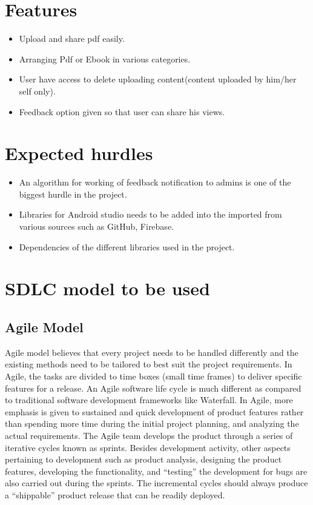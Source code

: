 \section{Features}
\begin{itemize}
	\item Upload and share pdf easily.
	\item Arranging Pdf or Ebook in various categories.
	\item User have access to delete uploading content(content uploaded by him/her self only). 
	 \item Feedback option given so that user can share his views.
\end{itemize}

	 	
\section{Expected hurdles}
\begin{itemize}
\item An algorithm for working of feedback notification to admins is one of the biggest hurdle in the project.
\item Libraries for Android studio needs to be added into the imported from various sources such as GitHub, Firebase.
\item Dependencies of the different libraries used in the project.

\end{itemize}

\section{SDLC model to be used}
\subsection{Agile Model}
 
Agile model believes that every project needs to be handled differently and the existing methods need to be tailored to best suit the project requirements. In Agile, the tasks are divided to time boxes (small time frames) to deliver specific features for a release. An Agile software life cycle is much different as compared to traditional software development frameworks like Waterfall. In Agile, more emphasis is given to sustained and quick development of product features rather than spending more time during the initial project planning, and analyzing the actual requirements. The Agile team develops the product through a series of iterative cycles known as sprints. Besides development activity, other aspects pertaining to development such as product analysis, designing the product features, developing the functionality, and “testing” the development for bugs are also carried out during the sprints. The incremental cycles should always produce a “shippable” product release that can be readily deployed.

